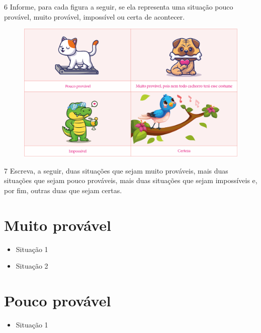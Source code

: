 \pagebreak
\num{6} Informe, para cada figura a seguir, se ela representa uma situação pouco
provável, muito provável, impossível ou certa de acontecer.

\begin{figure}[htpb!]
\includegraphics[width=\textwidth]{./media/image88.png}
\end{figure}

\num{7} Escreva, a seguir, duas situações que sejam muito prováveis, mais duas
situações que sejam pouco prováveis, mais duas situações que sejam
impossíveis e, por fim, outras duas que sejam certas.



\section*{Muito provável}

\begin{itemize}
\item Situação 1
\end{itemize}

\begin{itemize}
\item Situação 2
\end{itemize}

\section*{Pouco provável}

\begin{itemize}
\item Situação 1
\end{itemize}

